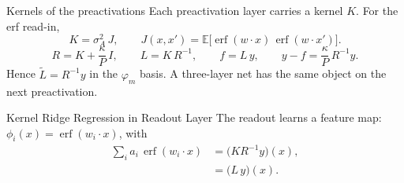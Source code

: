 \documentclass[aspectratio=169]{beamer}
\begin{document}

\begin{frame}{Kernels of the preactivations}
  Each preactivation layer carries a kernel \(K\).
  For the erf read-in,
  \begin{equation*}
    K
    =
    \sigma_A^{2}\, J,
    \qquad
    J(x,x')
    =
    \mathbb{E}\bigl[
      \operatorname{erf}(w\cdot x)\,
      \operatorname{erf}(w\cdot x')
    \bigr].
  \end{equation*}
  \begin{equation*}
    R
    =
    K+\frac{\kappa}{P}\,I,
    \qquad
    L
    =
    K\,R^{-1},
    \qquad
    f
    =
    L\,y,
    \qquad
    y-f
    =
    \frac{\kappa}{P}\,R^{-1}y.
  \end{equation*}
  Hence \(\tilde{L}=R^{-1}y\) in the \(\varphi_m\) basis.
  A three-layer net has the same object on the next preactivation.
\end{frame}

\begin{frame}{Kernel Ridge Regression in Readout Layer}
  The readout learns a feature map:
  \(\phi_i(x)=\operatorname{erf}(w_i\cdot x)\),
  with
  \begin{align*}
    \sum_{i}
    a_i\,
    \operatorname{erf}(w_i\cdot x)
    &=
    \bigl(KR^{-1} y\bigr)(x),
    \\
    &=
    \bigl(L\,y\bigr)(x).
  \end{align*}
\end{frame}
\end{document}
